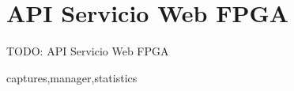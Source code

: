 \chapter{API Servicio Web FPGA\label{extra:api_servicio_web_fpga}}

TODO: API Servicio Web FPGA

{captures,manager,statistics}